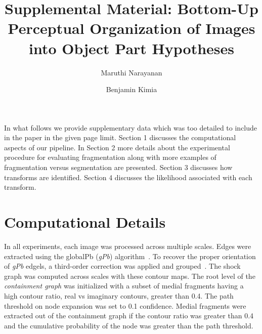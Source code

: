 \documentclass[runningheads,a4paper]{llncs}
\begin{document}
\mainmatter  %

\title{Supplemental Material: Bottom-Up Perceptual Organization of Images into Object Part Hypotheses}


\author{Maruthi Narayanan \and Benjamin Kimia}
%



\maketitle

In what follows we provide supplementary data which was too detailed to include in the paper in the given page limit. Section 1 discusses the computational aspects of our pipeline. In Section 2 more details about the experimental procedure for evaluating fragmentation along with more examples of fragmentation versus segmentation are presented. Section 3 discusses how transforms are identified. Section 4 discusses the likelihood associated with each transform.


\section{Computational Details} In all experiments, each image was processed across multiple scales. Edges were extracted using the globalPb ({\it gPb}) algorithm~\cite{Maire:etal:CVPR08}. To recover the proper orientation of {\it gPb} edgels, a third-order correction was applied and grouped~\cite{Tamrakar:Kimia:ICCV07}. The shock graph was computed across scales with these contour maps. The root level of the {\em containment graph} was initialized with a subset of medial fragments having a high contour ratio, real vs imaginary contours, greater than 0.4. The path threshold on node expansion was set to 0.1 confidence. Medial fragments were extracted out of the containment graph if the contour ratio was greater than 0.4 and the cumulative probability of the node was greater than the path threshold. 
\end{document}
